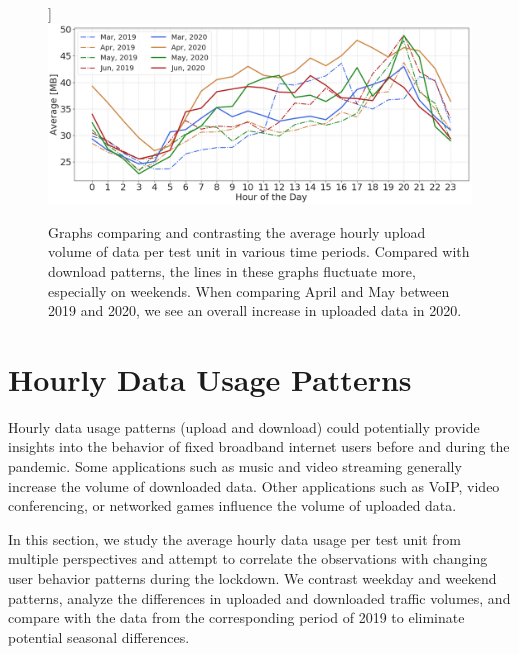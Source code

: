 \begin{figure}[th]
    \label{upload-e}]{%
        \includegraphics[width=0.48\linewidth]{figs/wenjun/upload_wdays_compare_36.png}%
    }
    \hfil

    \caption{Graphs comparing and contrasting the average hourly upload volume of data per test unit in various time periods. Compared with download patterns, the lines in these graphs fluctuate more, especially on weekends. When comparing April and May between 2019 and 2020, we see an overall increase in uploaded data in 2020.}
  \label{fig:upload_data_per_user_hours_fig}
\end{figure}


\section{Hourly Data Usage Patterns}
\label{sec:hourly-data-usage-patterns}

Hourly data usage patterns (upload and download) could potentially provide insights into the behavior of fixed broadband internet users before and during the pandemic. Some applications such as music and video streaming generally increase the volume of downloaded data. Other applications such as VoIP, video conferencing, or networked games influence the volume of uploaded data.

In this section, we study the average hourly data usage per test unit from multiple perspectives and attempt to correlate the observations with changing user behavior patterns during the lockdown. We contrast weekday and weekend patterns, analyze the differences in uploaded and downloaded traffic volumes, and compare with the data from the corresponding period of 2019 to eliminate potential seasonal differences.

